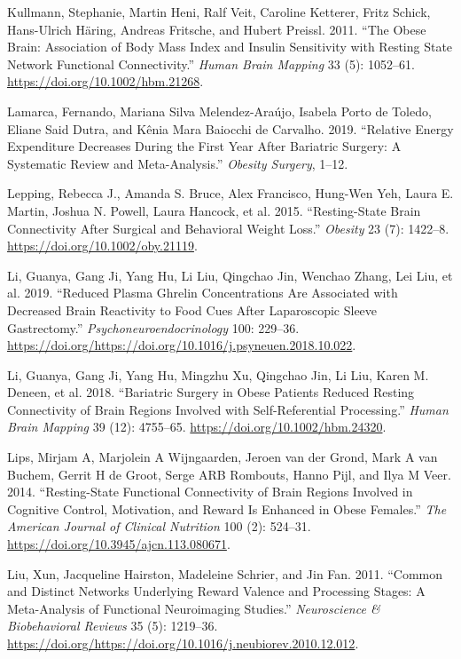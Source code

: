 \documentclass[
]{article}
\begin{document}
\leavevmode\hypertarget{ref-Kullmann_2011}{}%
Kullmann, Stephanie, Martin Heni, Ralf Veit, Caroline Ketterer, Fritz Schick, Hans-Ulrich Häring, Andreas Fritsche, and Hubert Preissl. 2011. ``The Obese Brain: Association of Body Mass Index and Insulin Sensitivity with Resting State Network Functional Connectivity.'' \emph{Human Brain Mapping} 33 (5): 1052--61. \url{https://doi.org/10.1002/hbm.21268}.

\leavevmode\hypertarget{ref-Lamarca_2019}{}%
Lamarca, Fernando, Mariana Silva Melendez-Araújo, Isabela Porto de Toledo, Eliane Said Dutra, and Kênia Mara Baiocchi de Carvalho. 2019. ``Relative Energy Expenditure Decreases During the First Year After Bariatric Surgery: A Systematic Review and Meta-Analysis.'' \emph{Obesity Surgery}, 1--12.

\leavevmode\hypertarget{ref-Lepping_2015}{}%
Lepping, Rebecca J., Amanda S. Bruce, Alex Francisco, Hung-Wen Yeh, Laura E. Martin, Joshua N. Powell, Laura Hancock, et al. 2015. ``Resting-State Brain Connectivity After Surgical and Behavioral Weight Loss.'' \emph{Obesity} 23 (7): 1422--8. \url{https://doi.org/10.1002/oby.21119}.

\leavevmode\hypertarget{ref-Li_2019}{}%
Li, Guanya, Gang Ji, Yang Hu, Li Liu, Qingchao Jin, Wenchao Zhang, Lei Liu, et al. 2019. ``Reduced Plasma Ghrelin Concentrations Are Associated with Decreased Brain Reactivity to Food Cues After Laparoscopic Sleeve Gastrectomy.'' \emph{Psychoneuroendocrinology} 100: 229--36. \url{https://doi.org/https://doi.org/10.1016/j.psyneuen.2018.10.022}.

\leavevmode\hypertarget{ref-Li_2018}{}%
Li, Guanya, Gang Ji, Yang Hu, Mingzhu Xu, Qingchao Jin, Li Liu, Karen M. Deneen, et al. 2018. ``Bariatric Surgery in Obese Patients Reduced Resting Connectivity of Brain Regions Involved with Self-Referential Processing.'' \emph{Human Brain Mapping} 39 (12): 4755--65. \url{https://doi.org/10.1002/hbm.24320}.

\leavevmode\hypertarget{ref-Lips_2014}{}%
Lips, Mirjam A, Marjolein A Wijngaarden, Jeroen van der Grond, Mark A van Buchem, Gerrit H de Groot, Serge ARB Rombouts, Hanno Pijl, and Ilya M Veer. 2014. ``Resting-State Functional Connectivity of Brain Regions Involved in Cognitive Control, Motivation, and Reward Is Enhanced in Obese Females.'' \emph{The American Journal of Clinical Nutrition} 100 (2): 524--31. \url{https://doi.org/10.3945/ajcn.113.080671}.

\leavevmode\hypertarget{ref-Liu_2011}{}%
Liu, Xun, Jacqueline Hairston, Madeleine Schrier, and Jin Fan. 2011. ``Common and Distinct Networks Underlying Reward Valence and Processing Stages: A Meta-Analysis of Functional Neuroimaging Studies.'' \emph{Neuroscience \& Biobehavioral Reviews} 35 (5): 1219--36. \url{https://doi.org/https://doi.org/10.1016/j.neubiorev.2010.12.012}.
\end{document}
